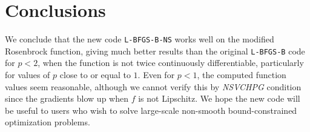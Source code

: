 \chapter{Conclusions}

We conclude that the new code \texttt{L-BFGS-B-NS} works well on the modified Rosenbrock function, giving much better results than the original \texttt{L-BFGS-B} code for $p < 2$, when the function is not twice continuously differentiable, particularly for values of $p$ close to or equal to $1$. Even for $p < 1$, the computed function values seem reasonable, although we cannot verify this by \emph{NSVCHPG} condition since the gradients blow up when $f$ is not Lipschitz. We hope the new code will be useful to users who wish to solve large-scale non-smooth bound-constrained optimization problems.

\pagebreak
\pagebreak
\clearpage
